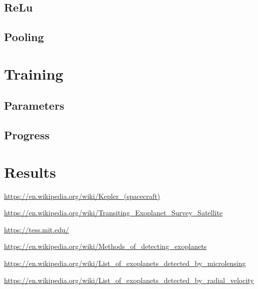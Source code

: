 \documentclass[twoside]{article}
\begin{document}
\begin{multicols}{2}
\subsection{ReLu}

\subsection{Pooling}



\section{Training}

\subsection{Parameters}

\subsection{Progress}


\section{Results}



\begin{thebibliography}{99}

\url{https://en.wikipedia.org/wiki/Kepler_(spacecraft)}

\url{https://en.wikipedia.org/wiki/Transiting_Exoplanet_Survey_Satellite}

\url{https://tess.mit.edu/}

\url{https://en.wikipedia.org/wiki/Methods_of_detecting_exoplanets}

\url{https://en.wikipedia.org/wiki/List_of_exoplanets_detected_by_microlensing}

\url{https://en.wikipedia.org/wiki/List_of_exoplanets_detected_by_radial_velocity}


\end{thebibliography}
\end{multicols}
\end{document}
